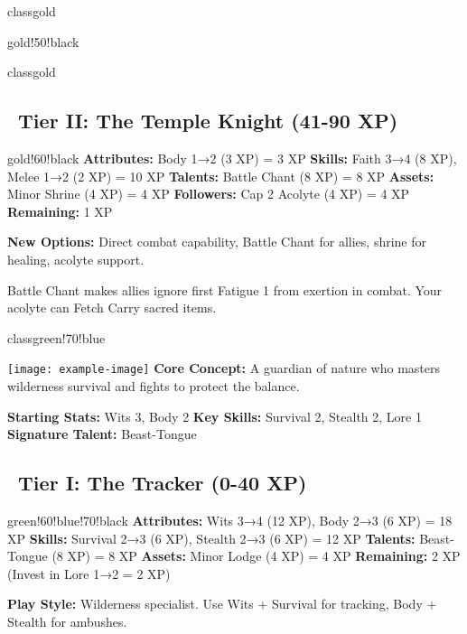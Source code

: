 \documentclass[11pt]{article}
\begin{document}
\begin{classguide}{classgold}
\begin{tierbox}{gold!50!black}
\begin{classguide}{classgold}
\subsection*{\faStar\faStar\ Tier II: The Temple Knight (41-90 XP)}
\begin{tierbox}{gold!60!black}
\textbf{Attributes:} Body 1→2 (3 XP) = 3 XP
\textbf{Skills:} Faith 3→4 (8 XP), Melee 1→2 (2 XP) = 10 XP
\textbf{Talents:} Battle Chant (8 XP) = 8 XP
\textbf{Assets:} Minor Shrine (4 XP) = 4 XP
\textbf{Followers:} Cap 2 Acolyte (4 XP) = 4 XP
\textbf{Remaining:} 1 XP
\end{tierbox}

\textbf{New Options:} Direct combat capability, Battle Chant for allies, shrine for healing, acolyte support.

\begin{tipbox}
Battle Chant makes allies ignore first Fatigue 1 from exertion in combat. Your acolyte can Fetch Carry sacred items.
\end{tipbox}
\end{classguide}

\newpage

\begin{classguide}{classgreen!70!blue}
\begin{multicols}{2}
\texttt{[image: example-image]}
\columnbreak
\textbf{Core Concept:} A guardian of nature who masters wilderness survival and fights to protect the balance.

\textbf{Starting Stats:} Wits 3, Body 2
\textbf{Key Skills:} Survival 2, Stealth 2, Lore 1
\textbf{Signature Talent:} Beast-Tongue
\end{multicols}

\subsection*{\faStar\ Tier I: The Tracker (0-40 XP)}
\begin{tierbox}{green!60!blue!70!black}
\textbf{Attributes:} Wits 3→4 (12 XP), Body 2→3 (6 XP) = 18 XP
\textbf{Skills:} Survival 2→3 (6 XP), Stealth 2→3 (6 XP) = 12 XP
\textbf{Talents:} Beast-Tongue (8 XP) = 8 XP
\textbf{Assets:} Minor Lodge (4 XP) = 4 XP
\textbf{Remaining:} 2 XP (Invest in Lore 1→2 = 2 XP)
\end{tierbox}

\textbf{Play Style:} Wilderness specialist. Use Wits + Survival for tracking, Body + Stealth for ambushes.


\end{classguide}
\end{tierbox}
\end{classguide}
\end{document}

